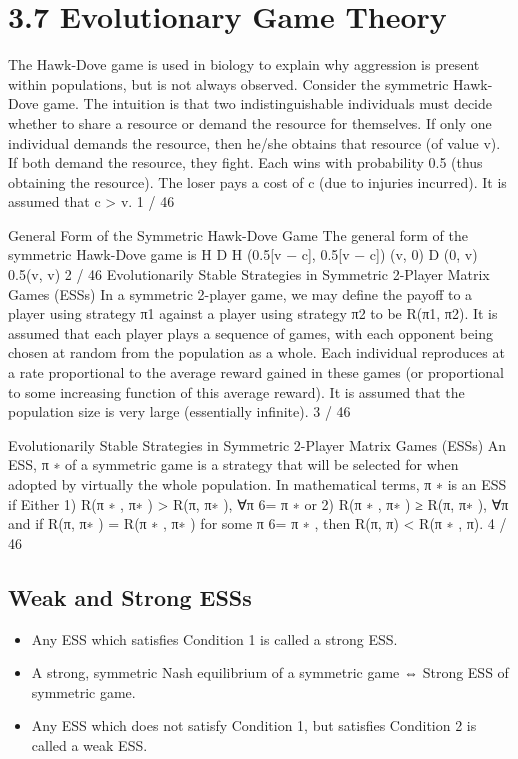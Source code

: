 \documentclass[]{report}
\begin{document}
	
	\section{3.7 Evolutionary Game Theory}
	The Hawk-Dove game is used in biology to explain why aggression
	is present within populations, but is not always observed.
	Consider the symmetric Hawk-Dove game. The intuition is that
	two indistinguishable individuals must decide whether to share a
	resource or demand the resource for themselves.
	If only one individual demands the resource, then he/she obtains
	that resource (of value v).
	If both demand the resource, they fight. Each wins with probability
	0.5 (thus obtaining the resource). The loser pays a cost of c (due
	to injuries incurred). It is assumed that c > v.
	1 / 46
	
	General Form of the Symmetric Hawk-Dove Game
	The general form of the symmetric Hawk-Dove game is
	H D
	H (0.5[v − c], 0.5[v − c]) (v, 0)
	D (0, v) 0.5(v, v)
	2 / 46
	Evolutionarily Stable Strategies in Symmetric 2-Player
	Matrix Games (ESSs)
	In a symmetric 2-player game, we may define the payoff to a player
	using strategy π1 against a player using strategy π2 to be
	R(π1, π2).
	It is assumed that each player plays a sequence of games, with each
	opponent being chosen at random from the population as a whole.
	Each individual reproduces at a rate proportional to the average
	reward gained in these games (or proportional to some increasing
	function of this average reward).
	It is assumed that the population size is very large (essentially
	infinite).
	3 / 46
	
	Evolutionarily Stable Strategies in Symmetric 2-Player
	Matrix Games (ESSs)
	An ESS, π
	∗ of a symmetric game is a strategy that will be selected
	for when adopted by virtually the whole population. In
	mathematical terms, π
	∗
	is an ESS if
	Either 1) R(π
	∗
	, π∗
	) > R(π, π∗
	), ∀π 6= π
	∗
	or 2) R(π
	∗
	, π∗
	) ≥ R(π, π∗
	), ∀π and if R(π, π∗
	) = R(π
	∗
	, π∗
	) for
	some π 6= π
	∗
	, then R(π, π) < R(π
	∗
	, π).
	4 / 46
	\subsection{Weak and Strong ESSs}
	\begin{itemize}
		\item Any ESS which satisfies Condition 1 is called a strong ESS.
\item A strong, symmetric Nash equilibrium of a symmetric game ⇔
		Strong ESS of symmetric game.
\item Any ESS which does not satisfy Condition 1, but satisfies
		Condition 2 is called a weak ESS.
	\end{itemize}
	
\end{document}
